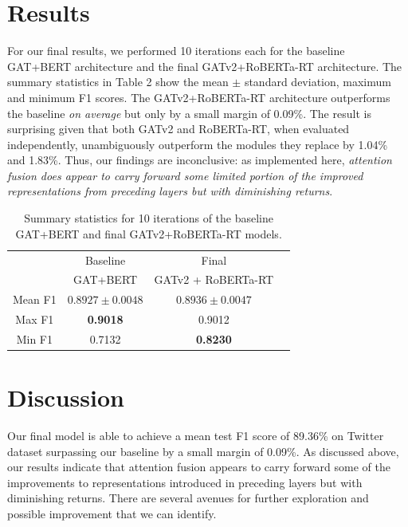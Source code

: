 \documentclass[letterpaper]{article} %
\begin{document}
\section{Results}

For our final results, we performed 10 iterations each for the baseline GAT+BERT architecture and the final GATv2+RoBERTa-RT architecture. The summary statistics in Table 2 show the mean $\pm$ standard deviation, maximum and minimum F1 scores. The GATv2+RoBERTa-RT architecture outperforms the baseline \textit{on average} but only by a small margin of 0.09\%. The result is surprising given that both GATv2 and RoBERTa-RT, when evaluated independently, unambiguously outperform the modules they replace by 1.04\% and 1.83\%. Thus, our findings are inconclusive: as implemented here, \textit{attention fusion does appear to carry forward some limited portion of the improved representations from preceding layers but with diminishing returns}. 

\begin{table}
    \begin{tabular}{|c||c|c|c|}
        \hline
        \hline 
         & Baseline & Final  \\
         & GAT+BERT & GATv2 + RoBERTa-RT  \\
        \hline
        Mean F1  & $0.8927\pm0.0048$ & $\mathbf{0.8936 \pm 0.0047}$  \\
        Max F1 & \textbf{0.9018} & 0.9012 \\
        Min F1 & 0.7132 & \textbf{0.8230} \\
        \hline
    \end{tabular}
    \caption{Summary statistics for 10 iterations of the baseline GAT+BERT and final GATv2+RoBERTa-RT models.}
\end{table}

\section{Discussion}

Our final model is able to achieve a mean test F1 score of 89.36\% on \citet{Miao2022} Twitter dataset surpassing our baseline by a small margin of 0.09\%. As discussed above, our results indicate that attention fusion appears to carry forward some of the improvements to representations introduced in preceding layers but with diminishing returns. There are several avenues for further exploration and possible improvement that we can identify. 
\end{document}
